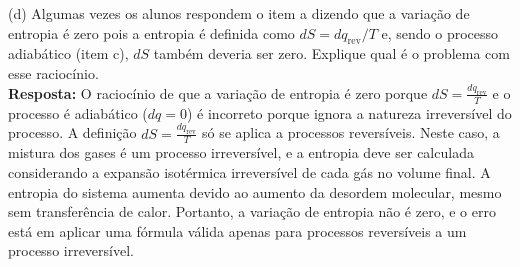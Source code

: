 (d) Algumas vezes os alunos respondem o item a dizendo que a variação de
entropia é zero pois a entropia é definida como \(dS= dq_{\text{rev}}/T\) e,
sendo o processo adiabático (item c), \(dS\) também deveria ser zero. Explique
qual é o problema com esse raciocínio.\\

    \textbf{Resposta:} O raciocínio de que a variação de entropia é zero porque 
    \(dS = \frac{dq_{\text{rev}}}{T}\) e o processo é adiabático (\(dq = 0\)) é 
    incorreto porque ignora a natureza irreversível do processo. A definição 
    \(dS = \frac{dq_{\text{rev}}}{T}\) só se aplica a processos reversíveis. 
    Neste caso, a mistura dos gases é um processo irreversível, e a entropia deve 
    ser calculada considerando a expansão isotérmica irreversível de cada gás no 
    volume final. A entropia do sistema aumenta devido ao aumento da desordem 
    molecular, mesmo sem transferência de calor. Portanto, a variação de entropia 
    não é zero, e o erro está em aplicar uma fórmula válida apenas para processos 
    reversíveis a um processo irreversível.

